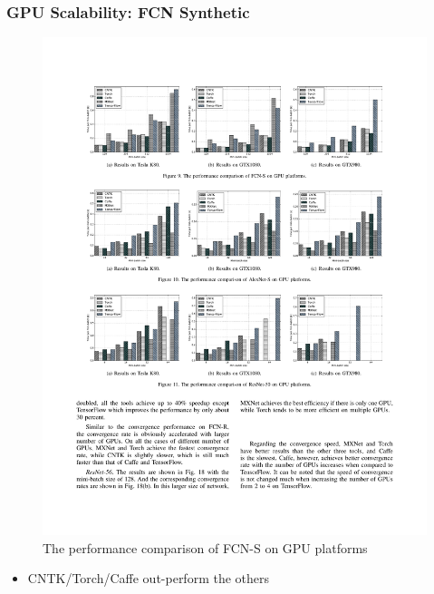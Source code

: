 \begin{frame}
	\MyLogo
	\frametitle{GPU Scalability: FCN Synthetic}

	\begin{figure}[htbp] 
		\includegraphics[width=\linewidth]{figures/FCN-S2.pdf} 
		\caption{The performance comparison of FCN-S on GPU platforms}
	\end{figure}

\vskip -10pt
\begin{mdframed}[style=mystyle1]
\begin{itemize}
\item CNTK/Torch/Caffe out-perform the others
\end{itemize}
\end{mdframed}

\end{frame}


